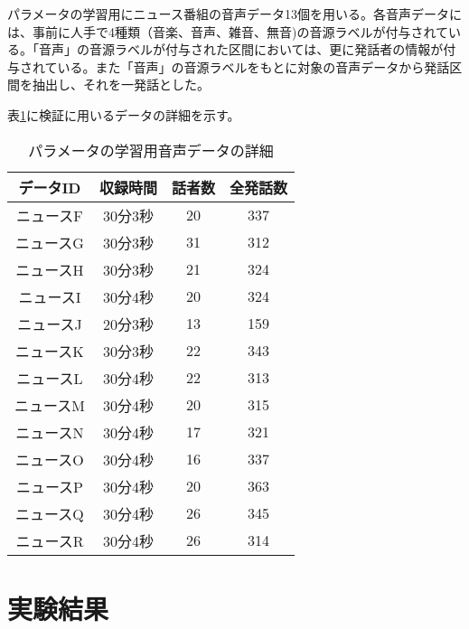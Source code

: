 \par
パラメータの学習用にニュース番組の音声データ13個を用いる。各音声データには、事前に人手で4種類（音楽、音声、雑音、無音)の音源ラベルが付与されている。「音声」の音源ラベルが付与された区間においては、更に発話者の情報が付与されている。また「音声」の音源ラベルをもとに対象の音声データから発話区間を抽出し、それを一発話とした。\par
表\ref{table:train_detail}に検証に用いるデータの詳細を示す。\vspace{0.2in}

\begin{table}[htb]
  \begin{center}
  \label{table:train_detail}
    \caption{パラメータの学習用音声データの詳細}
    \begin{tabular}{|c||c|c|c|} \hline
      データID & 収録時間 & 話者数 & 全発話数 \\ \hline
      ニュースF & 30分3秒 & 20 & 337 \\ \hline
      ニュースG & 30分3秒 & 31 & 312\\ \hline
      ニュースH & 30分3秒 & 21 & 324 \\ \hline
      ニュースI & 30分4秒 & 20 & 324\\ \hline
      ニュースJ & 20分3秒 & 13 & 159\\ \hline
      ニュースK & 30分3秒 & 22 & 343\\ \hline
      ニュースL & 30分4秒 & 22 & 313\\ \hline
      ニュースM & 30分4秒 & 20 & 315\\ \hline
      ニュースN & 30分4秒 & 17 & 321\\ \hline
      ニュースO & 30分4秒 & 16 & 337\\ \hline
      ニュースP & 30分4秒 & 20 & 363\\ \hline
      ニュースQ & 30分4秒 & 26 & 345\\ \hline
      ニュースR & 30分4秒 & 26 & 314\\ \hline
    \end{tabular}
  \end{center}
\end{table}


\section{実験結果}
